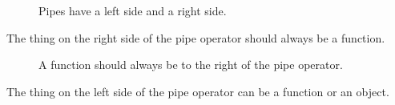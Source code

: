 \documentclass[
  letterpaper,
  DIV=11,
  numbers=noendperiod]{scrreprt}
\begin{document}
\begin{figure}


\caption{\label{fig-left-right}Pipes have a left side and a right side.}

\end{figure}%

The thing on the right side of the pipe operator should always be a
function.

\begin{figure}


\caption{\label{fig-right-side}A function should always be to the right
of the pipe operator.}

\end{figure}%

The thing on the left side of the pipe operator can be a function or an
object.
\end{document}
